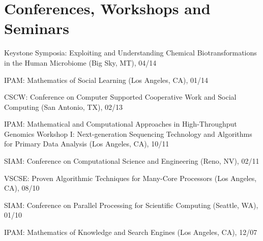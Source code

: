 \section{\sc Conferences, Workshops and Seminars}

{Keystone Symposia: Exploiting and Understanding Chemical Biotransformations in the Human Microbiome (Big Sky, MT), 04/14}

{IPAM: Mathematics of Social Learning (Los Angeles, CA), 01/14}

{CSCW: Conference on Computer Supported Cooperative Work and Social Computing (San Antonio, TX), 02/13}



{IPAM: Mathematical and Computational Approaches in High-Throughput Genomics Workshop I: Next-generation Sequencing Technology and Algorithms for Primary Data Analysis (Los Angeles, CA), 10/11}

{SIAM: Conference on Computational Science and Engineering (Reno, NV), 02/11}

{VSCSE: Proven Algorithmic Techniques for Many-Core Processors (Los Angeles, CA), 08/10}



{SIAM: Conference on Parallel Processing for Scientific Computing (Seattle, WA), 01/10}

{IPAM: Mathematics of Knowledge and Search Engines (Los Angeles, CA), 12/07}
